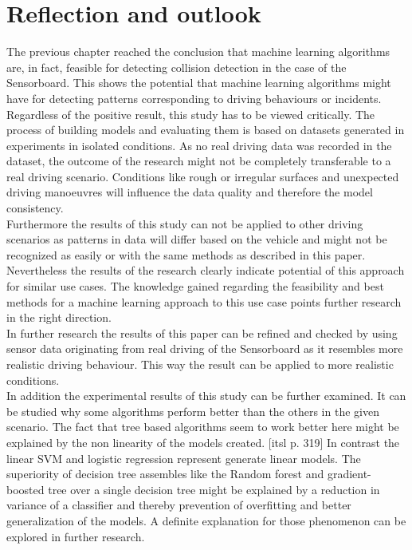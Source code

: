 \chapter{Reflection and outlook}
The previous chapter reached the conclusion that machine learning algorithms are, in fact, feasible for detecting collision detection in the case of the Sensorboard. This shows the potential that machine learning algorithms might have for detecting patterns corresponding to driving behaviours or incidents.
\\
Regardless of the positive result, this study has to be viewed critically. The process of building models and evaluating them is based on datasets generated in experiments in isolated conditions. As no real driving data was recorded in the dataset, the outcome of the research might not be completely transferable to a real driving scenario. Conditions like rough or irregular surfaces and unexpected driving manoeuvres will influence the data quality and therefore the model consistency. 
\\
Furthermore the results of this study can not be applied to other driving scenarios as patterns in data will differ based on the vehicle and might not be recognized as easily or with the same methods as described in this paper.
\\
Nevertheless the results of the research clearly indicate potential of this approach for similar use cases. The knowledge gained regarding the feasibility and best methods for a machine learning approach to this use case points further research in the right direction.
\\
In further research the results of this paper can be refined and checked by using sensor data originating from real driving of the Sensorboard as it resembles more realistic driving behaviour. This way the result can be applied to more realistic conditions. 
\\
In addition the experimental results of this study can be further examined. It can be studied why some algorithms perform better than the others in the given scenario. The fact that tree based algorithms seem to work better here might be explained by the non linearity of the models created. [itsl p. 319] In contrast the linear SVM and logistic regression represent generate linear models. The superiority of decision tree assembles like  the Random forest and gradient-boosted tree over a single decision tree might be explained by a reduction in variance of a classifier and thereby prevention of overfitting and better generalization of the models. A definite explanation for those phenomenon can be explored in further research.
